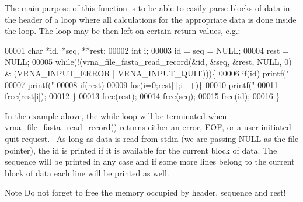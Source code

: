The main purpose of this function is to be able to easily parse blocks of data in the header of a loop where all calculations for the appropriate data is done inside the loop. The loop may be then left on certain return values, e.\+g.\+: 
\begin{DoxyCode}
00001 char *id, *seq, **rest;
00002 int  i;
00003 id = seq = NULL;
00004 rest = NULL;
00005 while(!(vrna\_file\_fasta\_read\_record(&id, &seq, &rest, NULL, 0) & (VRNA\_INPUT\_ERROR |
       VRNA\_INPUT\_QUIT)))\{
00006   if(id) printf("%
00007   printf("%
00008   if(rest)
00009     for(i=0;rest[i];i++)\{
00010       printf("%
00011       free(rest[i]);
00012     \}
00013   free(rest);
00014   free(seq);
00015   free(id);
00016 \}
\end{DoxyCode}
 In the example above, the while loop will be terminated when \hyperlink{group__file__utils_ga8cfb7e271efc9e1f34640acb85475639}{vrna\+\_\+file\+\_\+fasta\+\_\+read\+\_\+record()} returns either an error, E\+OF, or a user initiated quit request.~\newline
 As long as data is read from stdin (we are passing N\+U\+LL as the file pointer), the id is printed if it is available for the current block of data. The sequence will be printed in any case and if some more lines belong to the current block of data each line will be printed as well.

\begin{DoxyNote}{Note}
Do not forget to free the memory occupied by header, sequence and rest!
\end{DoxyNote}

